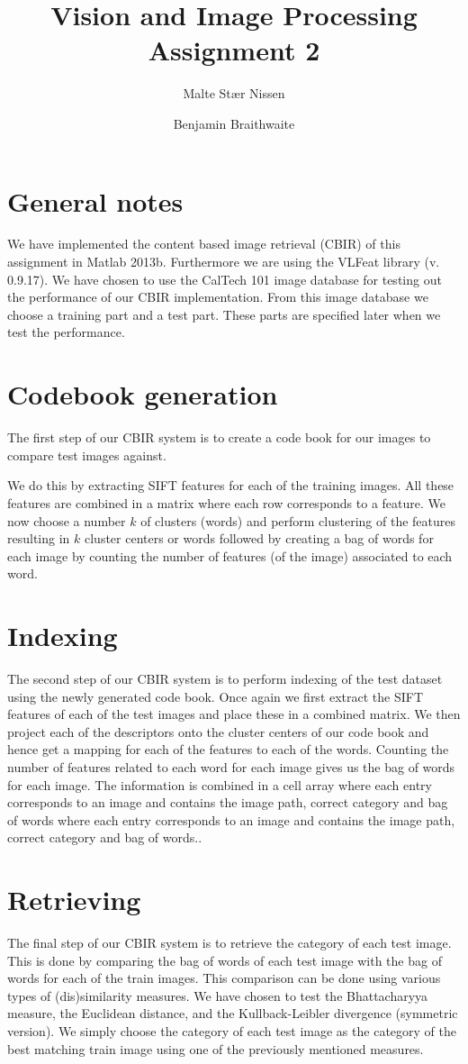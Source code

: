 \documentclass[11pt,a4paper]{article}
\title{Vision and Image Processing\\Assignment 2}
\author{Malte Stær Nissen \and Benjamin Braithwaite}
\begin{document}
\maketitle

\section{General notes}
We have implemented the content based image retrieval (CBIR) of this assignment
in Matlab 2013b. Furthermore we are using the VLFeat library (v. 0.9.17). We
have chosen to use the CalTech 101 image database for testing out the
performance of our CBIR implementation. From this image database we choose a
training part and a test part. These parts are specified later when we test the
performance.

\section{Codebook generation}
The first step of our CBIR system is to create a code book for our images to
compare test images against.

We do this by extracting SIFT features for each of the training images. All
these features are combined in a matrix where each row corresponds to a
feature. We now choose a number $k$ of clusters (words) and perform clustering
of the features resulting in $k$ cluster centers or words followed by creating
a bag of words for each image by counting the number of features (of the image)
associated to each word.

\section{Indexing}
The second step of our CBIR system is to perform indexing of the test dataset
using the newly generated code book. Once again we first extract the SIFT
features of each of the test images and place these in a combined matrix. We
then project each of the descriptors onto the cluster centers of our code book
and hence get a mapping for each of the features to each of the words. Counting
the number of features related to each word for each image gives us the bag of
words for each image. The information is combined in a cell array where each
entry corresponds to an image and contains the image path, correct category and
bag of words where each entry corresponds to an image and contains the image
path, correct category and bag of words..

\section{Retrieving}
The final step of our CBIR system is to retrieve the category of each test
image. This is done by comparing the bag of words of each test image with the
bag of words for each of the train images. This comparison can be done using
various types of (dis)similarity measures. We have chosen to test the
Bhattacharyya measure, the Euclidean distance, and the
Kullback-Leibler divergence (symmetric version). We simply choose the category
of each test image as the category of the best matching train image using one of
the previously mentioned measures.
\end{document}

